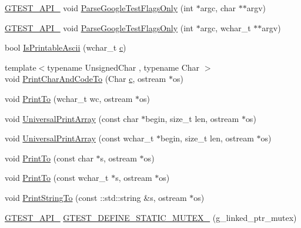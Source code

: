 \begin{DoxyCompactItemize}
\item 
\hyperlink{gtest-port_8h_aa73be6f0ba4a7456180a94904ce17790}{G\+T\+E\+S\+T\+\_\+\+A\+P\+I\+\_\+} void \hyperlink{namespacetesting_1_1internal_a472880afbcc592a41e3d623e2dec8412}{Parse\+Google\+Test\+Flags\+Only} (int $\ast$argc, char $\ast$$\ast$argv)
\item 
\hyperlink{gtest-port_8h_aa73be6f0ba4a7456180a94904ce17790}{G\+T\+E\+S\+T\+\_\+\+A\+P\+I\+\_\+} void \hyperlink{namespacetesting_1_1internal_aa3c81a67914856448d0778990d9d9cab}{Parse\+Google\+Test\+Flags\+Only} (int $\ast$argc, wchar\+\_\+t $\ast$$\ast$argv)
\item 
bool \hyperlink{namespacetesting_1_1internal_a744a6dd74c12d1e2c16b3c03e14ed4d4}{Is\+Printable\+Ascii} (wchar\+\_\+t \hyperlink{jquery_8js_abce695e0af988ece0826d9ad59b8160d}{c})
\item 
{\footnotesize template$<$typename Unsigned\+Char , typename Char $>$ }\\void \hyperlink{namespacetesting_1_1internal_a0c577e598e61d339ba45dd6643fb1969}{Print\+Char\+And\+Code\+To} (Char \hyperlink{jquery_8js_abce695e0af988ece0826d9ad59b8160d}{c}, ostream $\ast$os)
\item 
void \hyperlink{namespacetesting_1_1internal_aa74ea9d64f76ce69eceb225ca5ebef58}{Print\+To} (wchar\+\_\+t wc, ostream $\ast$os)
\item 
void \hyperlink{namespacetesting_1_1internal_a070107e7a8205ad6ec4d538d52b15b38}{Universal\+Print\+Array} (const char $\ast$begin, size\+\_\+t len, ostream $\ast$os)
\item 
void \hyperlink{namespacetesting_1_1internal_a52394019018eb5079f9f1bcca23dcd60}{Universal\+Print\+Array} (const wchar\+\_\+t $\ast$begin, size\+\_\+t len, ostream $\ast$os)
\item 
void \hyperlink{namespacetesting_1_1internal_adc6c98306d40b53fd07be4e295102a0a}{Print\+To} (const char $\ast$s, ostream $\ast$os)
\item 
void \hyperlink{namespacetesting_1_1internal_afc20fb56b2547a8f91f9ff99650f2024}{Print\+To} (const wchar\+\_\+t $\ast$s, ostream $\ast$os)
\item 
void \hyperlink{namespacetesting_1_1internal_ad609167d8d6792b0fb186539e0e159bd}{Print\+String\+To} (const \+::std\+::string \&s, ostream $\ast$os)
\item 
\hyperlink{gtest-port_8h_aa73be6f0ba4a7456180a94904ce17790}{G\+T\+E\+S\+T\+\_\+\+A\+P\+I\+\_\+} \hyperlink{namespacetesting_1_1internal_aff419d76acc3727be48d195f927189c9}{G\+T\+E\+S\+T\+\_\+\+D\+E\+F\+I\+N\+E\+\_\+\+S\+T\+A\+T\+I\+C\+\_\+\+M\+U\+T\+E\+X\+\_\+} (g\+\_\+linked\+\_\+ptr\+\_\+mutex)

\end{DoxyCompactItemize}
